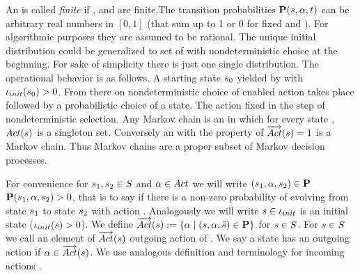 \documentclass[preview]{standalone}
\begin{document}
An \mdpN is called \emph{finite} if \states, \actions and \atomicprops are finite.The transition probabilities ${\textbf{P}}({s}, {\alpha}, t)$ can be arbitrary real numbers in $[0,1]$ (that sum up to 1 or 0 for fixed \state and \action). For algorithmic purposes they are assumed to be rational.  The unique initial distribution \initdistrib could be generalized to set of \initdistrib with nondeterministic choice at the beginning. For sake of simplicity there is just one single distribution. The operational behavior is as follows. A starting state ${s}_0$ yielded by \initdistrib with ${\iota_{init}}({s}_0) > 0$. From there on nondeterministic choice of enabled action takes place followed by a probabilistic choice of a state. The action fixed in the step of nondeterministic selection. Any Markov chain is an \mdpN in which for every state \state, ${Act}({s})$ is a singleton set. Conversely an \mdpN with the property of ${\overrightarrow{{Act}}}({s}) = 1$ is a Markov chain. Thus Markov chains are a proper subset of Markov decision processes.


For convenience for ${s}_1, {s}_2 \in {S}$ and ${\alpha} \in {Act}$ we will write $({s}_1, {\alpha}, {s}_2) \in {\textbf{P}}$ \iffN ${\textbf{P}}({s}_1, {\alpha}, {s}_2) > 0$, that is to say if there is a non-zero probability of evolving from state ${s}_1$ to state ${s}_2$ with action \action. Analogously we will write ${s} \in {\iota_{init}}$ \iffN is an initial state (${\iota_{init}}({s}) > 0$). 
We define ${\overrightarrow{{Act}}}({s}) := \{{\alpha} \mid ({s},{\alpha},{\tilde{{s}}}) \in {\ensuremath{{\textbf{P}}}}\}$ for ${s} \in {S}$. For ${s} \in {S}$ we call an element of ${\overrightarrow{{Act}}}({s})$ outgoing action of \state. We say a state has an outgoing action \action if ${\alpha} \in {\overrightarrow{\ensuremath{{Act}}}}({s})$. We use analogous definition and terminology for incoming actions \inacts. 
\end{document}

